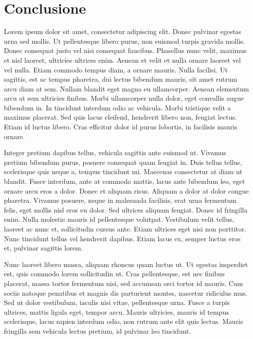 \chapter{Conclusione}

Lorem ipsum dolor sit amet, consectetur adipiscing elit. Donec pulvinar egestas urna sed mollis. Ut pellentesque libero purus, non euismod turpis gravida mollis. Donec consequat justo vel nisi consequat faucibus. Phasellus nunc velit, maximus et nisl laoreet, ultricies ultrices enim. Aenean et velit et nulla ornare laoreet vel vel nulla. Etiam commodo tempus diam, a ornare mauris. Nulla facilisi. Ut sagittis, est ac tempus pharetra, dui lectus bibendum mauris, sit amet rutrum arcu diam at sem. Nullam blandit eget magna eu ullamcorper. Aenean elementum arcu at sem ultricies finibus. Morbi ullamcorper nulla dolor, eget convallis augue bibendum in. In tincidunt interdum odio ac vehicula. Morbi tristique velit a maximus placerat. Sed quis lacus eleifend, hendrerit libero non, feugiat lectus. Etiam id luctus libero. Cras efficitur dolor id purus lobortis, in facilisis mauris ornare.

Integer pretium dapibus tellus, vehicula sagittis ante euismod ut. Vivamus pretium bibendum purus, posuere consequat quam feugiat in. Duis tellus tellus, scelerisque quis neque a, tempus tincidunt mi. Maecenas consectetur at diam ut blandit. Fusce interdum, ante at commodo mattis, lacus ante bibendum leo, eget ornare arcu eros a dolor. Donec et aliquam risus. Aliquam a dolor at dolor congue pharetra. Vivamus posuere, neque in malesuada facilisis, erat urna fermentum felis, eget mollis nisl eros eu dolor. Sed ultrices aliquam feugiat. Donec id fringilla enim. Nulla molestie mauris id pellentesque volutpat. Vestibulum velit tellus, laoreet ac nunc et, sollicitudin cursus ante. Etiam ultrices eget nisi non porttitor. Nunc tincidunt tellus vel hendrerit dapibus. Etiam lacus ex, semper luctus eros et, pulvinar sagittis lorem.

Nunc laoreet libero massa, aliquam rhoncus quam luctus ut. Ut egestas imperdiet est, quis commodo lorem sollicitudin ut. Cras pellentesque, est nec finibus placerat, massa tortor fermentum nisi, sed accumsan orci tortor id mauris. Cum sociis natoque penatibus et magnis dis parturient montes, nascetur ridiculus mus. Sed ut dolor vestibulum, iaculis nisi vitae, pellentesque urna. Fusce a turpis ultrices, mattis ligula eget, tempor arcu. Mauris ultricies, mauris id tempus scelerisque, lacus sapien interdum odio, non rutrum ante elit quis lectus. Mauris fringilla sem vehicula lectus pretium, id pulvinar leo tincidunt.